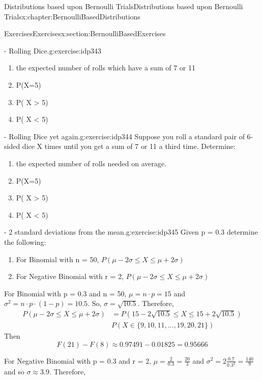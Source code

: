 \documentclass[oneside,10pt,]{book}
\numberwithin{equation}{section}
\begin{document}
\begin{chapterptx}{Distributions based upon Bernoulli Trials}{}{Distributions based upon Bernoulli Trials}{}{}{x:chapter:BernoulliBasedDistributions}
\begin{sectionptx}{Exercises}{}{Exercises}{}{}{x:section:BernoulliBasedExercises}
\begin{inlineexercise}{- Rolling Dice.}{g:exercise:idp343}
\begin{enumerate}
\item{}the expected number of rolls which have a sum of 7 or 11%
\item{}P(X=5)%
\item{}P( X \textgreater{} 5)%
\item{}P( X \textless{} 5)%
\end{enumerate}
%
\end{inlineexercise}%
\begin{inlineexercise}{- Rolling Dice yet again.}{g:exercise:idp344}%
Suppose you roll a standard pair of 6-sided dice X times until you get a sum of 7 or 11 a third time. Determine:%
\begin{enumerate}
\item{}the expected number of rolls needed on average.%
\item{}P(X=5)%
\item{}P( X \textgreater{} 5)%
\item{}P( X \textless{} 5)%
\end{enumerate}
%
\end{inlineexercise}%
\begin{inlineexercise}{- 2 standard deviations from the mean.}{g:exercise:idp345}%
Given p = 0.3 determine the following:%
\begin{enumerate}
\item{}For Binomial with n = 50, \(P(\mu - 2\sigma \le X \le \mu + 2\sigma)\)%
\item{}For Negative Binomial with r = 2, \(P(\mu - 2\sigma \le X \le \mu + 2\sigma)\)%
\end{enumerate}
%
\par\smallskip%
\noindent\hypertarget{g:solution:idp346}{}For Binomial with p = 0.3 and n = 50, \(\mu = n \cdot p = 15\) and \(\sigma^2 = n \cdot p \cdot (1-p) = 10.5\).  So, \(\sigma = \sqrt{10.5}\).  Therefore,%
\begin{align*}
P(\mu - 2\sigma \le X \le \mu + 2\sigma) & = P(15 - 2 \sqrt{10.5} \le X \le 15 + 2 \sqrt{10.5})\\
& P( X \in \{9, 10, 11, ... , 19, 20, 21 \} )
\end{align*}
Then%
\begin{equation*}
F(21) - F(8) \approx 0.97491 - 0.01825 = 0.95666 
\end{equation*}
%
\par
For Negative Binomial with p = 0.3 and r = 2, \(\mu = \frac{2}{0.3} = \frac{20}{3}\) and \(\sigma^2 = 2 \frac{0.7}{0.3^2} = \frac{140}{9}\) and so \(\sigma \approx 3.9\).  Therefore,%

\end{inlineexercise}
\end{sectionptx}
\end{chapterptx}
\end{document}

